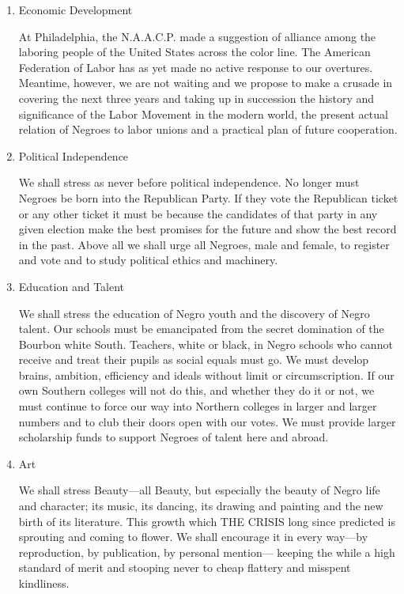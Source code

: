 \documentclass[letterpaper,10pt,english]{jupyterBook}
\begin{document}
\begin{enumerate}
%
\item {} 
\sphinxAtStartPar
Economic Development

\sphinxAtStartPar
At Philadelphia, the N.A.A.C.P. made a suggestion of alliance among the laboring people of the United States across the color line. The American Federation of Labor has as yet made no active response to our overtures. Meantime, however, we are not waiting and we \sphinxhyphen{}propose to make a crusade in  covering the next three years and taking up in succession the history and significance of the Labor Movement in the modern world, the present actual relation of Negroes to labor unions and a practical plan of future cooperation.

\item {} 
\sphinxAtStartPar
Political Independence

\sphinxAtStartPar
We shall stress as never before political independence. No longer must Negroes be born into the Republican Party. If they vote the Republican ticket or any other ticket it must be because the candidates of that party in any given election make the best promises for the future and show the best record in the past. Above all we shall urge all Negroes, male and female, to register and vote and to study political ethics and machinery.

\item {} 
\sphinxAtStartPar
Education and Talent

\sphinxAtStartPar
We shall stress the education of Negro youth and the discovery of Negro talent. Our schools must be emancipated from the secret domination of the Bourbon white South. Teachers, white or black, in Negro schools who cannot receive and treat their pupils as social equals must go. We must develop brains, ambition, efficiency and ideals without limit or circumscription. If our own Southern colleges will not do this, and whether they do it or not, we must  continue to force our way into Northern colleges in larger and larger numbers and to club their doors open with our votes. We must provide larger scholarship funds to support Negroes of talent here and abroad.

\item {} 
\sphinxAtStartPar
Art

\sphinxAtStartPar
We shall stress Beauty—all Beauty, but especially the beauty of Negro life and character; its music, its dancing, its drawing and painting and the new birth of its literature. This growth which THE CRISIS long since predicted is sprouting and coming to flower. We shall encourage it in every way—by reproduction, by publication, by personal mention— keeping the while a high standard of merit and stooping never to cheap flattery and misspent kindliness.


\end{enumerate}
\end{document}
